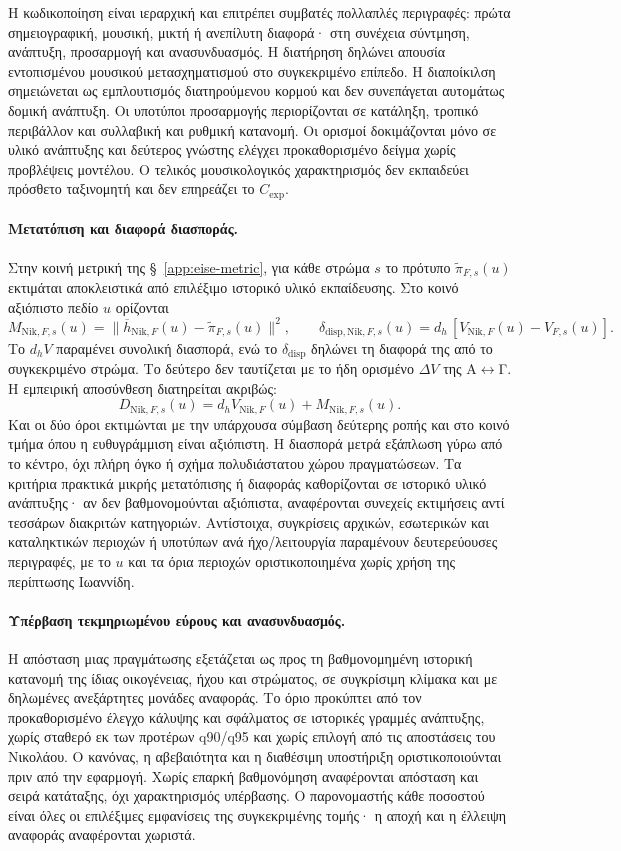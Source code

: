 \documentclass[11pt,a4paper]{article}
\begin{document}
Η κωδικοποίηση είναι ιεραρχική και επιτρέπει συμβατές πολλαπλές περιγραφές: πρώτα σημειογραφική, μουσική, μικτή ή ανεπίλυτη διαφορά· στη συνέχεια σύντμηση, ανάπτυξη, προσαρμογή και ανασυνδυασμός. Η διατήρηση δηλώνει απουσία εντοπισμένου μουσικού μετασχηματισμού στο συγκεκριμένο επίπεδο. Η διαποίκιλση σημειώνεται ως εμπλουτισμός διατηρούμενου κορμού και δεν συνεπάγεται αυτομάτως δομική ανάπτυξη. Οι υποτύποι προσαρμογής περιορίζονται σε κατάληξη, τροπικό περιβάλλον και συλλαβική και ρυθμική κατανομή. Οι ορισμοί δοκιμάζονται μόνο σε υλικό ανάπτυξης και δεύτερος γνώστης ελέγχει προκαθορισμένο δείγμα χωρίς προβλέψεις μοντέλου. Ο τελικός μουσικολογικός χαρακτηρισμός δεν εκπαιδεύει πρόσθετο ταξινομητή και δεν επηρεάζει το $C_{\mathrm{exp}}$.

\paragraph{Μετατόπιση και διαφορά διασποράς.}
Στην κοινή μετρική της §~\ref{app:eise-metric}, για κάθε στρώμα $s$ το πρότυπο $\widetilde\pi_{F,s}(u)$ εκτιμάται αποκλειστικά από επιλέξιμο ιστορικό υλικό εκπαίδευσης. Στο κοινό αξιόπιστο πεδίο $u$ ορίζονται
\[
M_{\mathrm{Nik},F,s}(u)=\|\overline h_{\mathrm{Nik},F}(u)-\widetilde\pi_{F,s}(u)\|^2,
\qquad
\delta_{\mathrm{disp},\mathrm{Nik},F,s}(u)=d_h\,[V_{\mathrm{Nik},F}(u)-V_{F,s}(u)].
\]
Το $d_hV$ παραμένει συνολική διασπορά, ενώ το $\delta_{\mathrm{disp}}$ δηλώνει τη διαφορά της από το συγκεκριμένο στρώμα. Το δεύτερο δεν ταυτίζεται με το ήδη ορισμένο $\Delta V$ της Α\(\leftrightarrow\)Γ. Η εμπειρική αποσύνθεση διατηρείται ακριβώς:
\[
D_{\mathrm{Nik},F,s}(u)=d_hV_{\mathrm{Nik},F}(u)+M_{\mathrm{Nik},F,s}(u).
\]
Και οι δύο όροι εκτιμώνται με την υπάρχουσα σύμβαση δεύτερης ροπής και στο κοινό τμήμα όπου η ευθυγράμμιση είναι αξιόπιστη. Η διασπορά μετρά εξάπλωση γύρω από το κέντρο, όχι πλήρη όγκο ή σχήμα πολυδιάστατου χώρου πραγματώσεων. Τα κριτήρια πρακτικά μικρής μετατόπισης ή διαφοράς καθορίζονται σε ιστορικό υλικό ανάπτυξης· αν δεν βαθμονομούνται αξιόπιστα, αναφέρονται συνεχείς εκτιμήσεις αντί τεσσάρων διακριτών κατηγοριών. Αντίστοιχα, συγκρίσεις αρχικών, εσωτερικών και καταληκτικών περιοχών ή υποτύπων ανά ήχο/λειτουργία παραμένουν δευτερεύουσες περιγραφές, με το $u$ και τα όρια περιοχών οριστικοποιημένα χωρίς χρήση της περίπτωσης Ιωαννίδη.

\paragraph{Υπέρβαση τεκμηριωμένου εύρους και ανασυνδυασμός.}
Η απόσταση μιας πραγμάτωσης εξετάζεται ως προς τη βαθμονομημένη ιστορική κατανομή της ίδιας οικογένειας, ήχου και στρώματος, σε συγκρίσιμη κλίμακα και με δηλωμένες ανεξάρτητες μονάδες αναφοράς. Το όριο προκύπτει από τον προκαθορισμένο έλεγχο κάλυψης και σφάλματος σε ιστορικές γραμμές ανάπτυξης, χωρίς σταθερό εκ των προτέρων q90/q95 και χωρίς επιλογή από τις αποστάσεις του Νικολάου. Ο κανόνας, η αβεβαιότητα και η διαθέσιμη υποστήριξη οριστικοποιούνται πριν από την εφαρμογή. Χωρίς επαρκή βαθμονόμηση αναφέρονται απόσταση και σειρά κατάταξης, όχι χαρακτηρισμός υπέρβασης. Ο παρονομαστής κάθε ποσοστού είναι όλες οι επιλέξιμες εμφανίσεις της συγκεκριμένης τομής· η αποχή και η έλλειψη αναφοράς αναφέρονται χωριστά.
\end{document}

